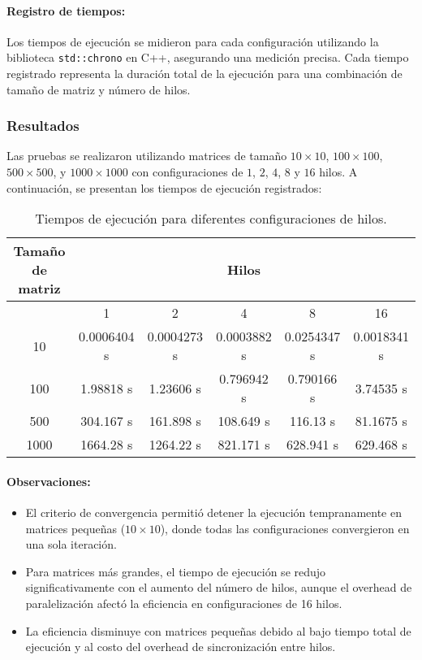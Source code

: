 \documentclass{article}
\begin{document}
\paragraph{Registro de tiempos:} Los tiempos de ejecución se midieron para cada configuración utilizando la biblioteca \texttt{std::chrono} en C++, asegurando una medición precisa. Cada tiempo registrado representa la duración total de la ejecución para una combinación de tamaño de matriz y número de hilos.

\subsubsection{Resultados}

Las pruebas se realizaron utilizando matrices de tamaño \(10 \times 10\), \(100 \times 100\), \(500 \times 500\), y \(1000 \times 1000\) con configuraciones de \(1\), \(2\), \(4\), \(8\) y \(16\) hilos. A continuación, se presentan los tiempos de ejecución registrados:

\begin{table}[H]
\centering
\begin{tabular}{|c|c|c|c|c|c|}
\hline
\textbf{Tamaño de matriz} & \multicolumn{5}{c|}{\textbf{Hilos}} \\ \hline
 & 1 & 2 & 4 & 8 & 16 \\ \hline
10   & 0.0006404 s & 0.0004273 s & 0.0003882 s & 0.0254347 s & 0.0018341 s \\ \hline
100  & 1.98818 s   & 1.23606 s   & 0.796942 s  & 0.790166 s  & 3.74535 s   \\ \hline
500  & 304.167 s   & 161.898 s   & 108.649 s   & 116.13 s    & 81.1675 s   \\ \hline
1000 & 1664.28 s   & 1264.22 s   & 821.171 s   & 628.941 s   & 629.468 s   \\ \hline
\end{tabular}
\caption{Tiempos de ejecución para diferentes configuraciones de hilos.}
\end{table}

\paragraph{Observaciones:}
\begin{itemize}
    \item El criterio de convergencia permitió detener la ejecución tempranamente en matrices pequeñas (\(10 \times 10\)), donde todas las configuraciones convergieron en una sola iteración.
    \item Para matrices más grandes, el tiempo de ejecución se redujo significativamente con el aumento del número de hilos, aunque el overhead de paralelización afectó la eficiencia en configuraciones de 16 hilos.
    \item La eficiencia disminuye con matrices pequeñas debido al bajo tiempo total de ejecución y al costo del overhead de sincronización entre hilos.
\end{itemize}
\end{document}
